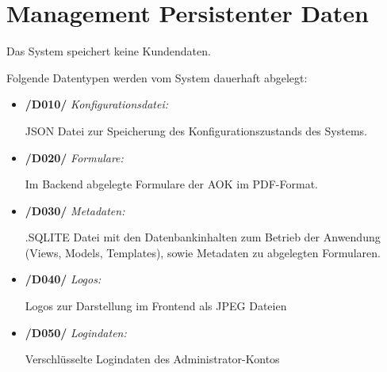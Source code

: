 \section{Management Persistenter Daten}

Das System speichert keine Kundendaten.\par
\vspace{0.5cm}
Folgende Datentypen werden vom System dauerhaft abgelegt:

\begin{itemize}
    \item \textbf{/D010/} \textit{Konfigurationsdatei:} \par
    JSON Datei zur Speicherung des Konfigurationszustands des Systems.
    
    \item \textbf{/D020/} \textit{Formulare:} \par
    Im Backend abgelegte Formulare der AOK im PDF-Format.
    
    \item \textbf{/D030/} \textit{Metadaten:} \par
    .SQLITE Datei mit den Datenbankinhalten zum Betrieb der Anwendung (Views, Models, Templates), sowie Metadaten zu abgelegten Formularen.
    
    \item \textbf{/D040/} \textit{Logos:} \par
    Logos zur Darstellung im Frontend als JPEG Dateien
    
    \item \textbf{/D050/} \textit{Logindaten:} \par
    Verschlüsselte Logindaten des Administrator-Kontos
\end{itemize}

